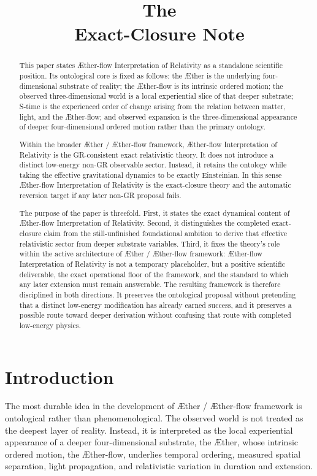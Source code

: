 \documentclass[11pt]{article}
\title{\textbf{The \TheoryName{}}\\[0.4em]
\large Exact-Closure Note}
\author{}
\date{}
\newcommand{\Aether}{\AE{}ther}
\newcommand{\Aflow}{\AE{}ther-flow}
\newcommand{\TheoryName}{\Aflow{} Interpretation of Relativity}
\newcommand{\TheoryProgram}{\Aether{} / \Aflow{} framework}
\begin{document}
\maketitle

\begin{abstract}
This paper states \TheoryName{} as a standalone scientific position. Its ontological core is fixed as follows: the \Aether{} is the underlying four-dimensional substrate of reality; the \Aflow{} is its intrinsic ordered motion; the observed three-dimensional world is a local experiential slice of that deeper substrate; S-time is the experienced order of change arising from the relation between matter, light, and the \Aflow{}; and observed expansion is the three-dimensional appearance of deeper four-dimensional ordered motion rather than the primary ontology.

Within the broader \TheoryProgram{}, \TheoryName{} is the GR-consistent exact relativistic theory. It does not introduce a distinct low-energy non-GR observable sector. Instead, it retains the ontology while taking the effective gravitational dynamics to be exactly Einsteinian. In this sense \TheoryName{} is the exact-closure theory and the automatic reversion target if any later non-GR proposal fails.

The purpose of the paper is threefold. First, it states the exact dynamical content of \TheoryName{}. Second, it distinguishes the completed exact-closure claim from the still-unfinished foundational ambition to derive that effective relativistic sector from deeper substrate variables. Third, it fixes the theory's role within the active architecture of \TheoryProgram{}: \TheoryName{} is not a temporary placeholder, but a positive scientific deliverable, the exact operational floor of the framework, and the standard to which any later extension must remain answerable. The resulting framework is therefore disciplined in both directions. It preserves the ontological proposal without pretending that a distinct low-energy modification has already earned success, and it preserves a possible route toward deeper derivation without confusing that route with completed low-energy physics.
\end{abstract}

\section{Introduction}

The most durable idea in the development of \TheoryProgram{} is ontological rather than phenomenological. The observed world is not treated as the deepest layer of reality. Instead, it is interpreted as the local experiential appearance of a deeper four-dimensional substrate, the \Aether{}, whose intrinsic ordered motion, the \Aflow{}, underlies temporal ordering, measured spatial separation, light propagation, and relativistic variation in duration and extension.
\end{document}
